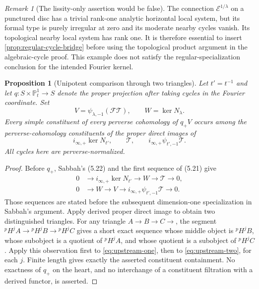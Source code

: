 \documentclass[11pt]{article}
\numberwithin{equation}{section}
\newtheorem{proposition}[proposition]{Proposition}
\theoremstyle{definition}
\theoremstyle{remark}
\newtheorem{remark}[remark]{Remark}
\newcommand{\Ecal}{\mathcal E}
\newcommand{\pH}{{}^{p}\!H}
\begin{document}
\begin{remark}[The lissity-only assertion would be false]
The connection $\Ecal^{1/\lambda}$ on a punctured disc has a trivial
rank-one analytic horizontal local system, but its formal type is purely
irregular at zero and its moderate nearby cycles vanish. Its topological
nearby local system has rank one. It is therefore essential to insert
\cref{prop:regular-cycle-bridge} before using the topological product
argument in the algebraic-cycle proof. This example does not satisfy the
regular-specialization conclusion for the intended Fourier kernel.
\end{remark}

\begin{proposition}[Unipotent comparison through two triangles]\label{prop:two-triangles}
Let $t'=t^{-1}$ and let $q:S\times\mathbb P^1_t\to S$ denote the
proper projection after taking cycles in the Fourier coordinate. Set
\[
 V=\psi_{\lambda,-1}(\mathcal F\mathcal T),\qquad W=\ker N_\lambda.
\]
Every simple constituent of every perverse cohomology of $q_+V$ occurs
among the perverse-cohomology constituents of the proper direct images of
\[
 i_{\infty,+}\ker N_{t'},\qquad
 \mathcal T,\qquad
 i_{\infty,+}\psi_{t',-1}\mathcal T.
\]
All cycles here are perverse-normalized.
\end{proposition}
\begin{proof}
Before $q_+$, Sabbah's (5.22) and the first sequence of (5.21) give
\begin{align}
0&\longrightarrow i_{\infty,+}\ker N_{t'}
 \longrightarrow W\longrightarrow\mathcal T\longrightarrow0,
 \label{eq:upstream-one}\\
0&\longrightarrow W\longrightarrow V
 \longrightarrow i_{\infty,+}\psi_{t',-1}\mathcal T\longrightarrow0.
 \label{eq:upstream-two}
\end{align}
Those sequences are stated before the subsequent dimension-one
specialization in Sabbah's argument. Apply derived proper direct image to
obtain two distinguished triangles. For any triangle $A\to B\to C\to$,
the segment
$\pH^jA\to\pH^jB\to\pH^jC$ gives a short exact sequence whose middle
object is $\pH^jB$, whose subobject is a quotient of $\pH^jA$, and whose
quotient is a subobject of $\pH^jC$. Apply this observation
first to \eqref{eq:upstream-one}, then to \eqref{eq:upstream-two}, for
each $j$. Finite length gives exactly the asserted constituent containment.
No exactness of $q_+$ on the heart, and no interchange of a constituent
filtration with a derived functor, is asserted.
\end{proof}
\end{document}
